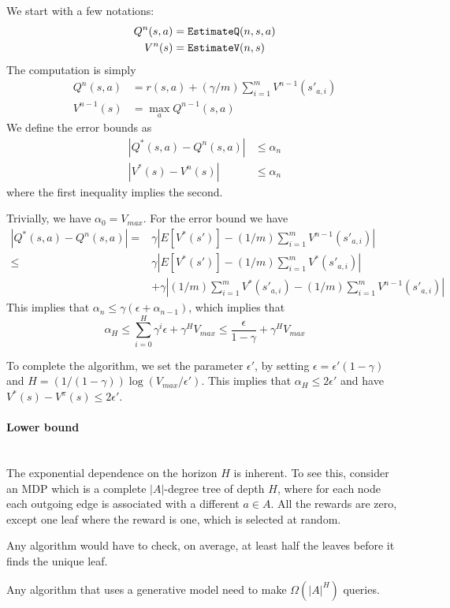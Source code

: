 We start with a few notations:
\begin{align*}
Q^n(s,a)&={\tt EstimateQ}(n,s,a)\\
V^n(s)&={\tt EstimateV}(n,s)
\end{align*}
The computation is simply
\begin{align*}
Q^n(s,a)&=r(s,a)+(\gamma/m)\sum_{i=1}^m V^{n-1}(s'_{a,i})\\
V^{n-1}(s)&=\max_a Q^{n-1}(s,a)
\end{align*}
We define the error bounds as
\begin{align*}
|Q^*(s,a)-Q^n(s,a)|&\leq \alpha_n\\
|V^*(s)-V^n(s)|&\leq \alpha_n
\end{align*}
where the first inequality implies the second.

Trivially, we have $\alpha_0=V_{max}$. For the error bound we have
\begin{align*}
|Q^*(s,a)-Q^n(s,a)|=&\gamma|E[V^*(s')]-(1/m)\sum_{i=1}^m
V^{n-1}(s'_{a,i})|\\
\leq &\gamma|E[V^*(s')]-(1/m)\sum_{i=1}^m V^{*}(s'_{a,i})|\\
&+\gamma|(1/m)\sum_{i=1}^m V^{*}(s'_{a,i})-(1/m)\sum_{i=1}^m
V^{n-1}(s'_{a,i})|
\end{align*}
This implies that $\alpha_n \leq \gamma(\epsilon+\alpha_{n-1})$,
which implies that
\[
\alpha_H\leq \sum_{i=0}^H \gamma^i \epsilon + \gamma^H V_{max}\leq
\frac{\epsilon}{1-\gamma}+\gamma^H V_{max}
\]

To complete the algorithm, we set the parameter $\epsilon'$, by
setting $\epsilon=\epsilon'(1-\gamma)$ and
$H=(1/(1-\gamma))\log(V_{max}/\epsilon')$. This implies that
$\alpha_H\leq 2\epsilon'$ and have $V^*(s)-V^\pi(s)\leq 2\epsilon'$.

\paragraph{Lower bound}\ \\

The exponential dependence on the horizon $H$ is inherent. To see
this, consider an MDP which is a complete $|A|$-degree tree of depth
$H$, where for each node each outgoing edge is associated with a
different $a\in A$. All the rewards are zero, except one leaf where
the reward is one, which is selected at random.

Any algorithm would have to check, on average, at least half the
leaves before it finds the unique leaf.

\begin{theorem}
Any algorithm that uses a generative model need to make
$\Omega(|A|^H)$ queries.
\end{theorem}
